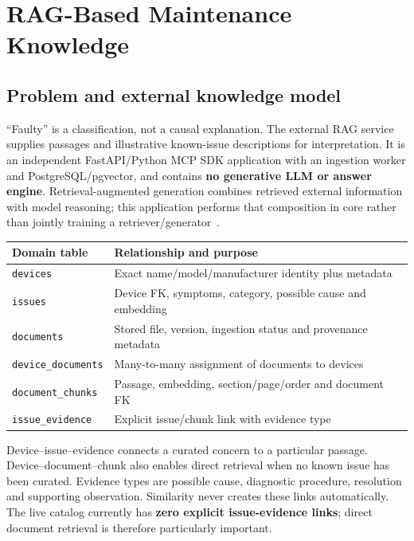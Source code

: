 \chapter{RAG-Based Maintenance Knowledge}
\section{Problem and external knowledge model}
``Faulty'' is a classification, not a causal explanation. The external RAG service supplies passages and illustrative known-issue descriptions for interpretation. It is an independent FastAPI/Python MCP SDK application with an ingestion worker and PostgreSQL/pgvector, and contains \textbf{no generative LLM or answer engine}. Retrieval-augmented generation combines retrieved external information with model reasoning; this application performs that composition in core rather than jointly training a retriever/generator~\cite{lewis}.
\par\smallskip\noindent\begin{tabularx}{\linewidth}{@{}lX@{}}\toprule
Domain table & Relationship and purpose\\\midrule
\texttt{devices} & Exact name/model/manufacturer identity plus metadata\\
\texttt{issues} & Device FK, symptoms, category, possible cause and embedding\\
\texttt{documents} & Stored file, version, ingestion status and provenance metadata\\
\texttt{device\_documents} & Many-to-many assignment of documents to devices\\
\texttt{document\_chunks} & Passage, embedding, section/page/order and document FK\\
\texttt{issue\_evidence} & Explicit issue/chunk link with evidence type\\\bottomrule
\end{tabularx}\par\smallskip
Device--issue--evidence connects a curated concern to a particular passage. Device--document--chunk also enables direct retrieval when no known issue has been curated. Evidence types are possible cause, diagnostic procedure, resolution and supporting observation. Similarity never creates these links automatically. The live catalog currently has \textbf{zero explicit issue-evidence links}; direct document retrieval is therefore particularly important.
